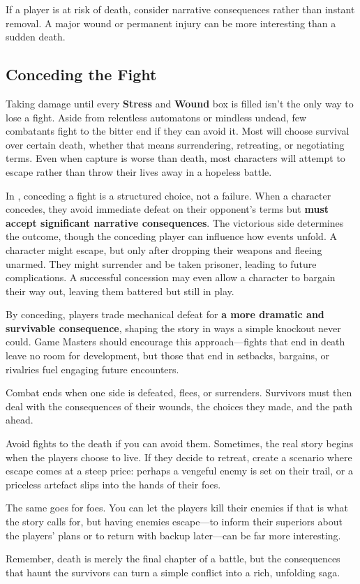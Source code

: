 \begin{GmTips}
	If a player is at risk of death, consider narrative consequences rather than instant removal. A major wound or permanent injury can be more interesting than a sudden death.
\end{GmTips}


\subsection{Conceding the Fight}\label{core:conceding}

Taking damage until every \textbf{Stress} and \textbf{Wound} box is filled isn’t the only way to lose a fight. Aside from relentless automatons or mindless undead, few combatants fight to the bitter end if they can avoid it. Most will choose survival over certain death, whether that means surrendering, retreating, or negotiating terms. Even when capture is worse than death, most characters will attempt to escape rather than throw their lives away in a hopeless battle.

In \wyrd, conceding a fight is a structured choice, not a failure. When a character concedes, they avoid immediate defeat on their opponent’s terms but \textbf{must accept significant narrative consequences}. The victorious side determines the outcome, though the conceding player can influence how events unfold. A character might escape, but only after dropping their weapons and fleeing unarmed. They might surrender and be taken prisoner, leading to future complications. A successful concession may even allow a character to bargain their way out, leaving them battered but still in play.

By conceding, players trade mechanical defeat for \textbf{a more dramatic and survivable consequence}, shaping the story in ways a simple knockout never could. Game Masters should encourage this approach—fights that end in death leave no room for development, but those that end in setbacks, bargains, or rivalries fuel engaging future encounters.

Combat ends when one side is defeated, flees, or surrenders. Survivors must then deal with the consequences of their wounds, the choices they made, and the path ahead.

\begin{GmTips}
	Avoid fights to the death if you can avoid them. Sometimes, the real story begins when the players choose to live. If they decide to retreat, create a scenario where escape comes at a steep price: perhaps a vengeful enemy is set on their trail, or a priceless artefact slips into the hands of their foes. 
	
	The same goes for foes. You can let the players kill their enemies if that is what the story calls for, but having enemies escape---to inform their superiors about the players' plans or to return with backup later---can be far more interesting.
	
	Remember, death is merely the final chapter of a battle, but the consequences that haunt the survivors can turn a simple conflict into a rich, unfolding saga.
\end{GmTips}

